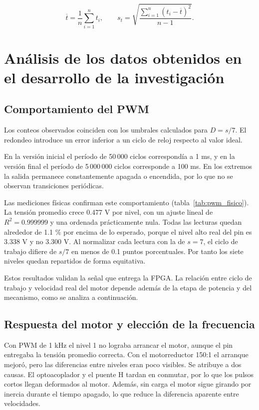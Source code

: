 \documentclass[12pt,letterpaper]{article}
\begin{document}
\begin{equation}
\overline{t}=\frac{1}{n}\sum_{i=1}^{n}t_i,
\qquad
s_t=\sqrt{\frac{\sum_{i=1}^{n}(t_i-\overline{t})^2}{n-1}}.
\end{equation}


\section{Análisis de los datos obtenidos en el desarrollo
de la investigación}

\subsection{Comportamiento del PWM}

Los conteos observados coinciden con los umbrales
calculados para $D=s/7$. El redondeo introduce un error
inferior a un ciclo de reloj respecto al valor ideal.

En la versión inicial el período de 50\,000 ciclos
correspondía a 1 ms, y en la versión final el período
de 5\,000\,000 ciclos corresponde a 100 ms. En los extremos
la salida permanece constantemente apagada o encendida,
por lo que no se observan transiciones periódicas.

Las mediciones físicas confirman este comportamiento
(tabla~\ref{tab:pwm_fisico}). La tensión promedio crece
0.477 V por nivel, con un ajuste lineal de
$R^2 = 0.999999$ y una ordenada prácticamente nula. Todas
las lecturas quedan alrededor de 1.1 \% por encima de lo
esperado, porque el nivel alto real del pin es 3.338 V y
no 3.300 V. Al normalizar cada lectura con la de $s=7$,
el ciclo de trabajo difiere de $s/7$ en menos de 0.1
puntos porcentuales. Por tanto los siete niveles quedan
repartidos de forma equitativa.

Estos resultados validan la señal que entrega la FPGA.
La relación entre ciclo de trabajo y velocidad real del
motor depende además de la etapa de potencia y del
mecanismo, como se analiza a continuación.

\subsection{Respuesta del motor y elección de la frecuencia}
\label{sec:motor}

Con PWM de 1 kHz el nivel 1 no lograba arrancar el motor,
aunque el pin entregaba la tensión promedio correcta. Con
el motorreductor 150:1 el arranque mejoró, pero las
diferencias entre niveles eran poco visibles. Se atribuye
a dos causas. El optoacoplador y el puente H tardan en
conmutar, por lo que los pulsos cortos llegan deformados
al motor. Además, sin carga el motor sigue girando por
inercia durante el tiempo apagado, lo que reduce la
diferencia aparente entre velocidades.
\end{document}
